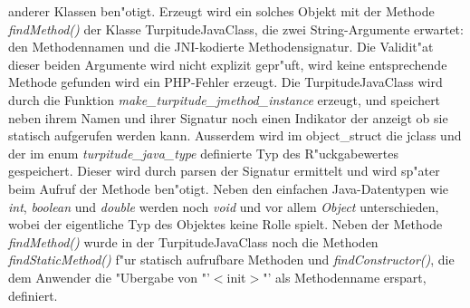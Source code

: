 anderer Klassen ben"otigt. Erzeugt wird ein solches Objekt mit der Methode \emph{findMethod()} der Klasse TurpitudeJavaClass, die zwei 
String-Argumente erwartet: den Methodennamen und die JNI-kodierte Methodensignatur. Die Validit"at dieser beiden Argumente wird nicht explizit
gepr"uft, wird keine entsprechende Methode gefunden wird ein PHP-Fehler erzeugt. Die TurpitudeJavaClass wird durch die Funktion
\emph{make\_turpitude\_jmethod\_instance} erzeugt, und speichert neben ihrem Namen und ihrer Signatur noch einen Indikator der anzeigt
ob sie statisch aufgerufen werden kann. Ausserdem wird im object\_struct die jclass und der im enum \emph{turpitude\_java\_type} definierte
Typ des R"uckgabewertes gespeichert. Dieser wird durch parsen der Signatur ermittelt und wird sp"ater beim Aufruf der Methode ben"otigt.
Neben den einfachen Java-Datentypen wie \emph{int}, \emph{boolean} und \emph{double} werden noch \emph{void} und vor allem \emph{Object} unterschieden,
wobei der eigentliche Typ des Objektes keine Rolle spielt.
Neben der Methode \emph{findMethod()} wurde in der TurpitudeJavaClass noch die Methoden \emph{findStaticMethod()} f"ur statisch
aufrufbare Methoden und \emph{findConstructor()}, die dem Anwender die "Ubergabe von "'$<$init$>$"' als Methodenname erspart, definiert.

